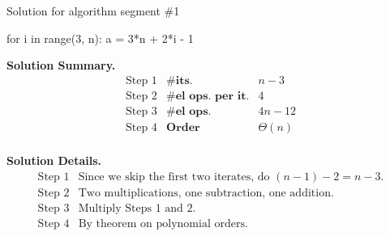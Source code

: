 \documentclass[10pt]{beamer}
\begin{document}
\begin{frame}[fragile]{Solution for algorithm segment \#1}

\begin{python}[basicstyle=\ttfamily\normalsize, numbers=none]
for i in range(3, n):
    a = 3*n + 2*i - 1
\end{python}

\colorbox{green!30}{\textbf{Solution Summary.}}
\[ 
\begin{array}{lll}
\text{Step 1} & \textbf{\# its.} & n-3 \\
\text{Step 2} & \textbf{\# el ops. per it.} & 4 \\
\text{Step 3}& \textbf{\# el ops.} & 4n-12 \\
\text{Step 4} & \textbf{Order} & \Theta(n) \\
\end{array}
\]

\colorbox{red!30}{\textbf{Solution Details.}}
\[ 
\begin{array}{ll}
\text{Step 1} & \text{Since we skip the first two iterates, do $(n-1) - 2 = n-3$.} \\
\text{Step 2} & \text{Two multiplications, one subtraction, one addition.} \\
\text{Step 3}& \text{Multiply Steps 1 and 2.} \\
\text{Step 4} & \text{By theorem on polynomial orders.}\\
\end{array}
\]
    	
\end{frame}
\end{document}
